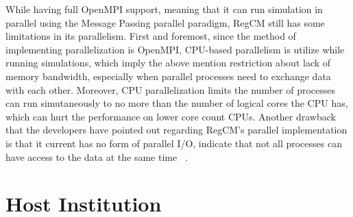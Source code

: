 While having full OpenMPI support, meaning that it can run simulation in parallel using the Message Passing parallel paradigm, RegCM still has some limitations in its parallelism. First and foremost, since the method of implementing parallelization is OpenMPI, CPU-based parallelism is utilize while running simulations, which imply the above mention restriction about lack of memory bandwidth, especially when parallel processes need to exchange data with each other. Moreover, CPU parallelization limits the number of processes can run simutaneously to no more than the number of logical cores the CPU has, which can hurt the performance on lower core count CPUs. Another drawback that the developers have pointed out regarding RegCM's parallel implementation is that it current has no form of parallel I/O, indicate that not all processes can have access to the data at the same time ~\cite{regcm_man}. \\

\section{Host Institution}

